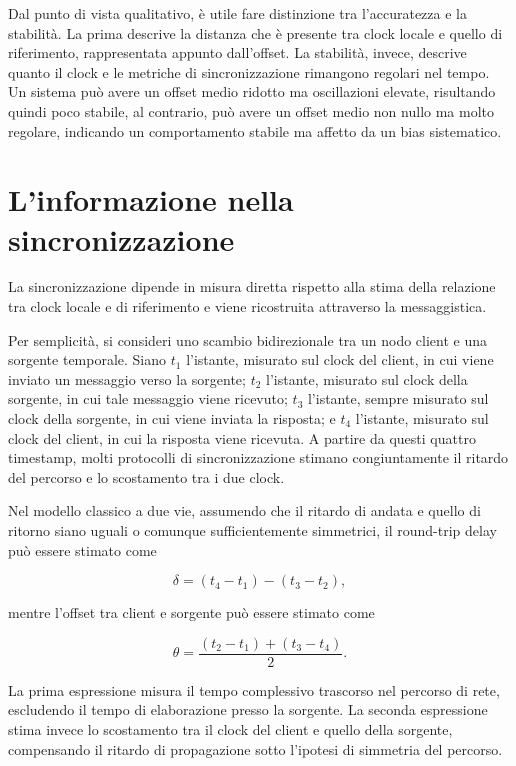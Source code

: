 Dal punto di vista qualitativo, è utile fare distinzione tra l'accuratezza e
la stabilità. La prima descrive la distanza che è presente tra clock locale e quello
di riferimento, rappresentata appunto dall'offset. La stabilità, invece, descrive
quanto il clock e le metriche di sincronizzazione rimangono regolari nel tempo.
Un sistema può avere un offset medio ridotto ma oscillazioni elevate, risultando quindi
poco stabile, al contrario, può avere un offset medio non nullo ma molto regolare,
indicando un comportamento stabile ma affetto da un bias sistematico.

\section{L'informazione nella sincronizzazione}

La sincronizzazione dipende in misura diretta rispetto alla stima della relazione
tra clock locale e di riferimento e viene ricostruita attraverso la messaggistica.

Per semplicità, si consideri uno scambio bidirezionale tra un nodo client e una
sorgente temporale. Siano $t_{1}$ l'istante, misurato sul clock del client, in cui
viene inviato un messaggio verso la sorgente; $t_{2}$ l'istante, misurato sul clock
della sorgente, in cui tale messaggio viene ricevuto; $t_{3}$ l'istante, sempre
misurato sul clock della sorgente, in cui viene inviata la risposta; e $t_{4}$ l'istante,
misurato sul clock del client, in cui la risposta viene ricevuta. A partire da questi
quattro timestamp, molti protocolli di sincronizzazione stimano congiuntamente
il ritardo del percorso e lo scostamento tra i due clock. \cite{martinNetworkTimeProtocol2010}

Nel modello classico a due vie, assumendo che il ritardo di andata e quello di ritorno
siano uguali o comunque sufficientemente simmetrici, il round-trip delay può
essere stimato come \cite{martinNetworkTimeProtocol2010}

\[
  \delta = (t_{4}- t_{1}) - (t_{3}- t_{2}),
\]

mentre l'offset tra client e sorgente può essere stimato come

\[
  \theta = \frac{(t_{2}- t_{1}) + (t_{3}- t_{4})}{2}.
\]

La prima espressione misura il tempo complessivo trascorso nel percorso di rete, escludendo
il tempo di elaborazione presso la sorgente. La seconda espressione stima invece
lo scostamento tra il clock del client e quello della sorgente, compensando il ritardo
di propagazione sotto l'ipotesi di simmetria del percorso.

